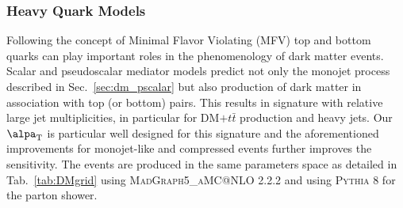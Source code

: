 \subsubsection{Heavy Quark Models}

Following the concept of Minimal Flavor Violating (MFV) top and bottom quarks can play important roles in the phenomenology of dark matter events.
Scalar and pseudoscalar mediator models predict not only the monojet process described in Sec.~\ref{sec:dm_pscalar} but also production of dark matter in association
with top (or bottom) pairs. This results in signature with relative large jet multiplicities, in particular for DM$+t\bar{t}$ production and heavy jets. Our $\alpa_{\textrm{T}}$ is particular well designed for this signature and the aforementioned improvements for monojet-like and compressed events further improves the sensitivity. The events are produced in the same parameters space as detailed in Tab.~\ref{tab:DMgrid} using \textsc{MadGraph5\_aMC@NLO} 2.2.2 and using \textsc{Pythia 8} for the parton shower.



